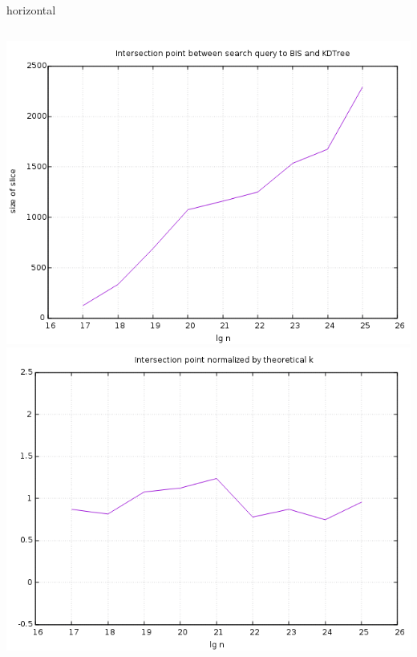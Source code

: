 \documentclass[pdf]{beamer}
\begin{document}
\begin{frame}{horizontal}
  \begin{columns}
    \includegraphics[scale=0.35]{pictures/analysis/hori.png}
    \includegraphics[scale=0.35]{pictures/analysis/hori_theory.png}
  \end{columns}
\end{frame}
\end{document}
